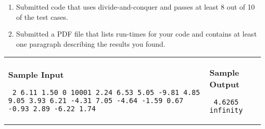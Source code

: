 \documentclass[11pt]{article}
\begin{document}
\begin{enumerate}

\item Submitted code that uses divide-and-conquer and passes at least 8 out of 10 of the test cases.

\item Submitted a PDF file that lists run-times for your code and contains at least one paragraph describing the results you found.

\end{enumerate} 


\vspace{0.25in}\hspace{-0.3in}\begin{tabular}{ll}

\parbox{3in}{{\large\bf Sample Input}

\vspace{0.15in}

{\tt 
2 6.11 1.50 0 10001 2.24 6.53 5.05 -9.81 4.85 9.05 3.93 6.21 -4.31 7.05 -4.64 -1.59 0.67 -0.93 2.89 -6.22 1.74
}
}

&

\parbox{3in}{{\large\bf Sample Output}

\vspace{0.15in}

{\tt
4.6265\linebreak
infinity
}
}

\vspace{0.2in}


\\
\end{tabular}
\end{document}
